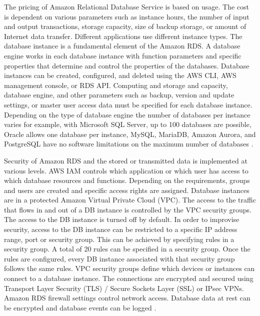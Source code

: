 \par The pricing of Amazon Relational Database Service is based on usage.
The cost is dependent on various parameters such as instance hours, the number of input and output transactions, storage capacity, size of backup storage, or amount of Internet data transfer.
Different applications use different instance types.
The database instance is a fundamental element of the Amazon RDS. A database engine works in each database instance with function parameters and specific properties that determine and control the properties of the databases. Database instances can be created, configured, and deleted using the AWS CLI, AWS management console, or RDS API. Computing and storage and capacity, database engine, and other parameters such as backup, version and update settings, or master user access data must be specified for each database instance. Depending on the type of database engine the number of databases per instance varies for example, with Microsoft SQL Server, up to 100 databases are possible, Oracle allows one database per instance, MySQL, MariaDB, Amazon Aurora, and PostgreSQL have no software limitations on the maximum number of databases \cite{35}.

\par Security of Amazon RDS and the stored or transmitted data is implemented at various levels.
AWS IAM controls which application or which user has access to which database resources and functions.
Depending on the requirements, groups and users are created and specific access rights are assigned.
Database instances are in a protected Amazon Virtual Private Cloud (VPC).
The access to the traffic that flows in and out of a DB instance is controlled by the VPC security groups.
The access to the DB instance is turned off by default.
In order to improvise security, access to the DB instance can be restricted to a specific IP address range, port or security group.
This can be achieved by specifying rules in a security group.
A total of 20 rules can be specified in a security group.
Once the rules are configured, every DB instance associated with that security group follows the same rules.
VPC security groups define which devices or instances can connect to a database instance.
The connections are encrypted and secured using Transport Layer Security (TLS) / Secure Sockets Layer (SSL) or IPsec VPNs. Amazon RDS firewall settings control network access. Database data at rest can be encrypted and database events can be logged \cite{71}.

